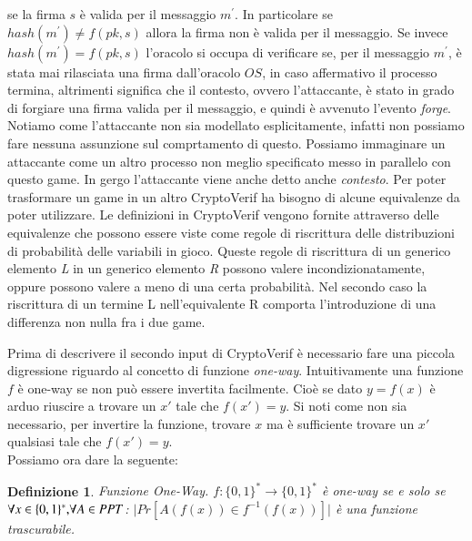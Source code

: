 \documentclass[a4paper,openright,twoside,12pt]{report}
\newtheorem{definizione}{Definizione}[chapter]
\begin{document}
se la firma $s$ \`e valida per il messaggio $m^{'}$. In particolare se $hash(m^{'}) \neq f(pk, s)$ allora la firma non \`e valida per il messaggio. Se invece $hash(m^{'}) = f(pk, s)$
l'oracolo si occupa di verificare se, per il messaggio $m^{'}$, \`e stata mai rilasciata una firma dall'oracolo $OS$, in caso affermativo il processo termina, altrimenti significa che 
il contesto, ovvero l'attaccante, \`e stato in grado di forgiare una firma valida per il messaggio, e quindi \`e avvenuto l'evento \emph{forge}.
Notiamo come l'attaccante non sia modellato esplicitamente, infatti non possiamo fare nessuna assunzione sul comprtamento di questo.
Possiamo immaginare un attaccante come un altro processo non meglio specificato messo in parallelo con questo game. In gergo l'attaccante viene anche detto anche \emph{contesto}.
Per poter trasformare un game in un altro CryptoVerif ha bisogno di alcune equivalenze da poter utilizzare.
Le definizioni in CryptoVerif vengono fornite attraverso delle equivalenze che possono essere viste come regole di riscrittura delle distribuzioni di probabilit\`a delle variabili in
gioco.
Queste regole di riscrittura di un generico elemento \emph{L} in un generico elemento \emph{R} possono valere incondizionatamente, 
oppure possono valere a meno di una certa probabilit\`a.
Nel secondo caso la riscrittura di un termine L nell'equivalente R comporta l'introduzione di una differenza non nulla fra i due game.

Prima di descrivere il secondo input di CryptoVerif \`e necessario fare una piccola digressione riguardo al concetto di funzione \emph{one-way}.
Intuitivamente una funzione $f$ \`e one-way se non pu\`o essere invertita facilmente. Cio\`e se dato $y=f(x)$ \`e arduo riuscire a trovare un $x'$ tale che $f(x')=y$. 
Si noti come non sia necessario, per invertire la funzione, trovare $x$ ma \`e sufficiente trovare un $x'$ qualsiasi tale che $f(x')=y$.
\\Possiamo ora dare la seguente:
\begin{definizione}{Funzione One-Way.}
$f: \{0,1\}^*\rightarrow \{0,1\}^*$ \`e one-way se e solo se $\forall x \in  \{0,1\}^* \hbox{,} \forall A \in PPT$:  $\lvert Pr[A(f(x)) \in f^{-1}(f(x))]\rvert$ \`e una funzione 
trascurabile.
\end{definizione}
\end{document}
